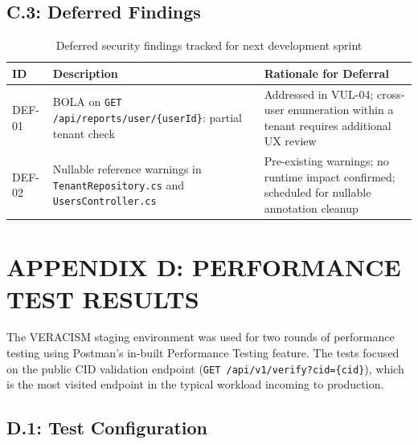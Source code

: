 \subsection*{C.3: Deferred Findings}

\begin{table}[H]
  \centering
  \smalltable
  \footnotesize
  {%
  \setlength{\tabcolsep}{6pt}
  \renewcommand{\arraystretch}{1.3}
  \begin{tabular}{|>{\centering\arraybackslash}p{}|
                  >{\raggedright\arraybackslash}p{}|
                  >{\raggedright\arraybackslash}p{}|}
    \hline
    \textbf{ID} & \textbf{Description} & \textbf{Rationale for Deferral} \\
    \hline\hline
    DEF-01 & BOLA on \texttt{GET /api/reports/user/\{userId\}}: partial tenant check & Addressed in VUL-04; cross-user enumeration within a tenant requires additional UX review \\
    \hline
    DEF-02 & Nullable reference warnings in \texttt{TenantRepository.cs} and \texttt{UsersController.cs} & Pre-existing warnings; no runtime impact confirmed; scheduled for nullable annotation cleanup \\
    \hline
  \end{tabular}
  }%
  \captionsetup{type=table}
  \caption{Deferred security findings tracked for next development sprint}
  \label{tab:security-deferred}
\end{table}

\clearpage
\section{APPENDIX D: PERFORMANCE TEST RESULTS}
\label{appendix:performance}

The VERACISM staging environment was used for two rounds of performance testing using Postman's in-built Performance Testing feature.  The tests
focused on the public CID validation endpoint
(\texttt{GET /api/v1/verify?cid=\{cid\}}), which is the most visited endpoint in the typical workload incoming to production.

\subsection*{D.1: Test Configuration}

